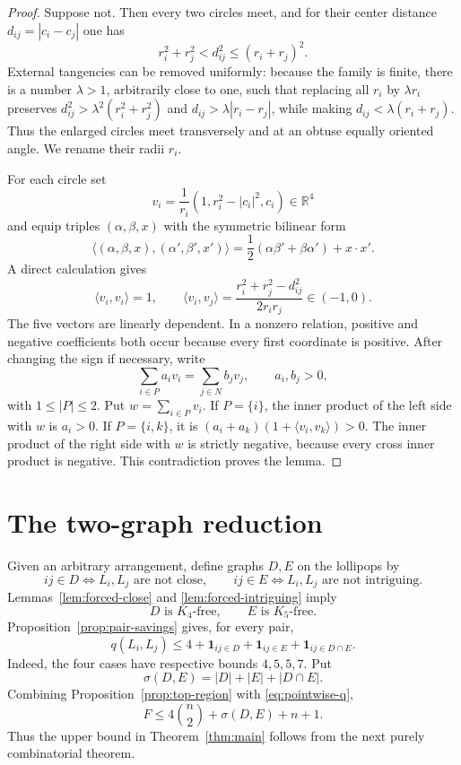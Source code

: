 \documentclass[11pt]{article}
\theoremstyle{plain}
\theoremstyle{definition}
\theoremstyle{remark}
\newcommand{\R}{\mathbb R}
\newcommand{\1}{\mathbf 1}
\begin{document}
\begin{proof}
Suppose not.  Then every two circles meet, and for their center distance
$d_{ij}=|c_i-c_j|$ one has
\begin{equation}\label{eq:nonintr}
 r_i^2+r_j^2<d_{ij}^2\leq(r_i+r_j)^2.
\end{equation}
External tangencies can be removed uniformly: because the family is finite,
there is a number $\lambda>1$, arbitrarily close to one, such that replacing
all $r_i$ by $\lambda r_i$ preserves
$d_{ij}^2>\lambda^2(r_i^2+r_j^2)$ and
$d_{ij}>\lambda|r_i-r_j|$, while making
$d_{ij}<\lambda(r_i+r_j)$.  Thus the enlarged circles meet transversely and
at an obtuse equally oriented angle.  We rename their radii $r_i$.

For each circle set
\[
 v_i=\frac1{r_i}(1,r_i^2-|c_i|^2,c_i)\in\R^4
\]
and equip triples $(\alpha,\beta,x)$ with the symmetric bilinear form
\[
 \langle(\alpha,\beta,x),(\alpha',\beta',x')\rangle
 =\frac12(\alpha\beta'+\beta\alpha')+x\cdot x'.
\]
A direct calculation gives
\[
 \langle v_i,v_i\rangle=1,
 \qquad
 \langle v_i,v_j\rangle
 =\frac{r_i^2+r_j^2-d_{ij}^2}{2r_ir_j}\in(-1,0).
\]
The five vectors are linearly dependent.  In a nonzero relation, positive
and negative coefficients both occur because every first coordinate is
positive.  After changing the sign if necessary, write
\[
 \sum_{i\in P}a_i v_i=\sum_{j\in N}b_j v_j,
 \qquad a_i,b_j>0,
\]
with $1\leq|P|\leq2$.  Put $w=\sum_{i\in P}v_i$.  If $P=\{i\}$, the inner
product of the left side with $w$ is $a_i>0$.  If $P=\{i,k\}$, it is
$(a_i+a_k)(1+\langle v_i,v_k\rangle)>0$.  The inner product of the right side
with $w$ is strictly negative, because every cross inner product is negative.
This contradiction proves the lemma.
\end{proof}

\section{The two-graph reduction}\label{sec:reduction}

Given an arbitrary arrangement, define graphs $D,E$ on the lollipops by
\[
 ij\in D\iff L_i,L_j\text{ are not close},
 \qquad
 ij\in E\iff L_i,L_j\text{ are not intriguing}.
\]
Lemmas~\ref{lem:forced-close} and \ref{lem:forced-intriguing} imply
\begin{equation}\label{eq:forbidden}
 D\text{ is }K_4\text{-free},\qquad E\text{ is }K_5\text{-free}.
\end{equation}
Proposition~\ref{prop:pair-savings} gives, for every pair,
\begin{equation}\label{eq:pointwise-q}
 q(L_i,L_j)\leq
 4+\1_{ij\in D}+\1_{ij\in E}+\1_{ij\in D\cap E}.
\end{equation}
Indeed, the four cases have respective bounds $4,5,5,7$.  Put
\[
 \sigma(D,E)=|D|+|E|+|D\cap E|.
\]
Combining Proposition~\ref{prop:top-region} with \eqref{eq:pointwise-q},
\begin{equation}\label{eq:region-upper-reduction}
 F\leq4\binom n2+\sigma(D,E)+n+1.
\end{equation}
Thus the upper bound in Theorem~\ref{thm:main} follows from the next purely
combinatorial theorem.
\end{document}
